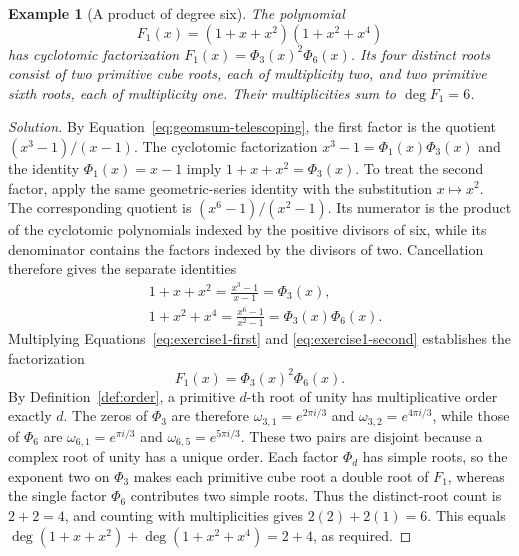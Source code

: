 \documentclass[11pt,a4paper]{article}
\numberwithin{equation}{section}
\theoremstyle{uprightpaper}
\newtheorem{example}{Example}[section]
\begin{document}
\begin{example}[A product of degree six]\label{exercise:one}
The polynomial
\begin{equation}\label{eq:exercise1-polynomial}
 F_1(x)=(1+x+x^2)(1+x^2+x^4)
\end{equation}
has cyclotomic factorization $F_1(x)=\Phi_3(x)^2\Phi_6(x)$. Its four distinct roots consist of two primitive cube roots, each of multiplicity two, and two primitive sixth roots, each of multiplicity one. Their multiplicities sum to $\deg F_1=6$.
\end{example}
\begin{proof}[Solution]
By Equation~\eqref{eq:geomsum-telescoping}, the first factor is the quotient $(x^3-1)/(x-1)$. The cyclotomic factorization $x^3-1=\Phi_1(x)\Phi_3(x)$ and the identity $\Phi_1(x)=x-1$ imply $1+x+x^2=\Phi_3(x)$. To treat the second factor, apply the same geometric-series identity with the substitution $x\mapsto x^2$. The corresponding quotient is $(x^6-1)/(x^2-1)$. Its numerator is the product of the cyclotomic polynomials indexed by the positive divisors of six, while its denominator contains the factors indexed by the divisors of two. Cancellation therefore gives the separate identities
\begin{subequations}\label{eq:exercise1-factors}
\begin{align}
 &1+x+x^2=\frac{x^3-1}{x-1}=\Phi_3(x),\label{eq:exercise1-first}\\
 &1+x^2+x^4=\frac{x^6-1}{x^2-1}=\Phi_3(x)\Phi_6(x).\label{eq:exercise1-second}
\end{align}
\end{subequations}
Multiplying Equations~\eqref{eq:exercise1-first} and \eqref{eq:exercise1-second} establishes the factorization
\begin{equation}\label{eq:exercise1}
 F_1(x)=\Phi_3(x)^2\Phi_6(x).
\end{equation}
By Definition~\ref{def:order}, a primitive $d$-th root of unity has multiplicative order exactly $d$. The zeros of $\Phi_3$ are therefore $\omega_{3,1}=e^{2\pi i/3}$ and $\omega_{3,2}=e^{4\pi i/3}$, while those of $\Phi_6$ are $\omega_{6,1}=e^{\pi i/3}$ and $\omega_{6,5}=e^{5\pi i/3}$. These two pairs are disjoint because a complex root of unity has a unique order. Each factor $\Phi_d$ has simple roots, so the exponent two on $\Phi_3$ makes each primitive cube root a double root of $F_1$, whereas the single factor $\Phi_6$ contributes two simple roots. Thus the distinct-root count is $2+2=4$, and counting with multiplicities gives $2(2)+2(1)=6$. This equals $\deg(1+x+x^2)+\deg(1+x^2+x^4)=2+4$, as required.
\end{proof}
\end{document}
